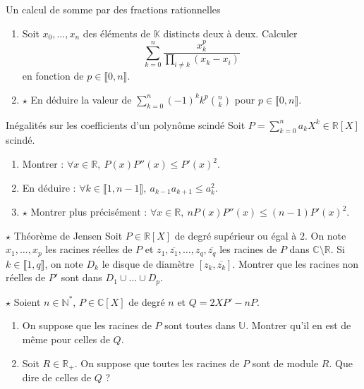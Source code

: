\documentclass[french,a4paper]{article}
\newcommand{\N}{\mathbb{N}}
\newcommand{\R}{\mathbb{R}}
\newcommand{\C}{\mathbb{C}}
\newcommand{\K}{\mathbb{K}}
\newcommand{\U}{\mathbb{U}}
\newcommand{\st}{^*}
\theoremstyle{plain}
\theoremstyle{definition}
\theoremstyle{remark}
\begin{document}
\begin{ex}[Moulin.39]{Un calcul de somme par des fractions rationnelles}
	\begin{enumerate}
		\item Soit $x_0,\ldots,x_n$ des éléments de $\K$ distincts deux à deux. Calculer $$\sum_{k=0}^{n}\frac{x_k^p}{\prod_{i\ne k}(x_k-x_i)}$$ en fonction de $p\in\llbracket0,n\rrbracket$.
		\item $\star$ En déduire la valeur de $\displaystyle\sum_{k=0}^{n}(-1)^kk^p\binom{n}{k}$ pour $p\in\llbracket0,n\rrbracket$.
	\end{enumerate}
\end{ex}

\begin{ex}[Moulin.40]{Inégalités sur les coefficients d'un polynôme scindé}
	Soit $P=\displaystyle\sum_{k=0}^{n}a_kX^k\in\R[X]$ scindé.
	\begin{enumerate}
		\item Montrer : $\forall x\in\R,\ P(x)P''(x)\leqslant P'(x)^2$.
		\item En déduire : $\forall k\in\llbracket1,n-1\rrbracket,\ a_{k-1}a_{k+1}\leqslant a_k^2$.
		\item $\star$ Montrer plus précisément : $\forall x\in\R,\ nP(x)P''(x)\leqslant(n-1)P'(x)^2$.
	\end{enumerate}
\end{ex}

\begin{ex}[Moulin.41]{$\star$ Théorème de Jensen}
	Soit $P\in\R[X]$ de degré supérieur ou égal à $2$. On note $x_1,\ldots,x_p$ les racines réelles de $P$ et $z_1,\overline{z_1},\ldots,z_q,\overline{z_q}$ les racines de $P$ dans $\C\setminus\R$. Si $k\in\llbracket 1,q\rrbracket$, on note $D_k$ le disque de diamètre $[z_k,\overline{z_k}]$. Montrer que les racines non réelles de $P'$ sont dans $D_1\cup\ldots\cup D_p$.
\end{ex}

\begin{ex}[Moulin.42]{$\star$}
	Soient $n\in\N\st$, $P\in\C[X]$ de degré $n$ et $Q=2XP'-nP$.
	\begin{enumerate}
		\item On suppose que les racines de $P$ sont toutes dans $\U$. Montrer qu'il en est de même pour celles de $Q$.
		\item Soit $R\in\R_+$. On suppose que toutes les racines de $P$ sont de module $R$. Que dire de celles de $Q$ ?
	\end{enumerate}
\end{ex}
\end{document}

